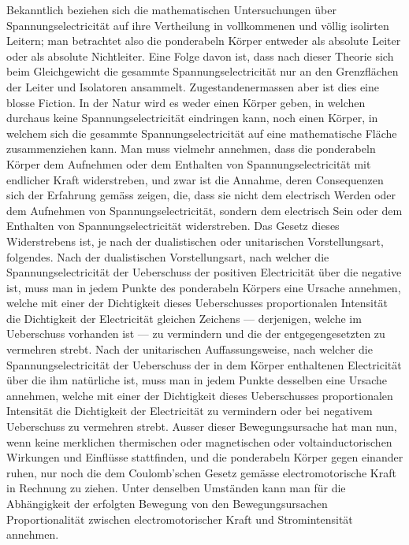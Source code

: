 \documentclass[12pt,a4paper]{article}
\begin{document}
Bekanntlich beziehen sich die mathematischen Untersuchungen über Spannungselectricität auf ihre Vertheilung in vollkommenen und völlig isolirten Leitern; man betrachtet also die ponderabeln Körper entweder als absolute Leiter oder als absolute Nichtleiter. Eine Folge davon ist, dass nach dieser Theorie sich beim Gleichgewicht die gesammte Spannungselectricität nur an den Grenzflächen der Leiter und Isolatoren ansammelt. Zugestandenermassen aber ist dies eine blosse Fiction. In der Natur wird es weder einen Körper geben, in welchen durchaus keine Spannungselectricität eindringen kann, noch einen Körper, in welchem sich die gesammte Spannungselectricität auf eine mathematische Fläche zusammenziehen kann. Man muss vielmehr annehmen, dass die ponderabeln Körper dem Aufnehmen oder dem Enthalten von Spannungselectricität mit endlicher Kraft widerstreben, und zwar ist die Annahme, deren Consequenzen sich der Erfahrung gemäss zeigen, die, dass sie nicht dem electrisch Werden oder dem Aufnehmen von Spannungselectricität, sondern dem electrisch Sein oder dem Enthalten von Spannungselectricität widerstreben. Das Gesetz dieses Widerstrebens ist, je nach der dualistischen oder unitarischen Vorstellungsart, folgendes. Nach der dualistischen Vorstellungsart, nach welcher die Spannungselectricität der Ueberschuss der positiven Electricität über die negative ist, muss man in jedem Punkte des ponderabeln Körpers eine Ursache annehmen, welche mit einer der Dichtigkeit dieses Ueberschusses proportionalen Intensität die Dichtigkeit der Electricität gleichen Zeichens --- derjenigen, welche im Ueberschuss vorhanden ist --- zu vermindern und die der entgegengesetzten zu vermehren strebt. Nach der unitarischen Auffassungsweise, nach welcher die Spannungselectricität der Ueberschuss der in dem Körper enthaltenen Electricität über die ihm natürliche ist, muss man in jedem Punkte desselben eine Ursache annehmen, welche mit einer der Dichtigkeit dieses Ueberschusses proportionalen Intensität die Dichtigkeit der Electricität zu vermindern oder bei negativem Ueberschuss zu vermehren strebt. Ausser dieser Bewegungsursache hat man nun, wenn keine merklichen thermischen oder magnetischen oder voltainductorischen Wirkungen und Einflüsse stattfinden, und die ponderabeln Körper gegen einander ruhen, nur noch die dem Coulomb'schen Gesetz gemässe electromotorische Kraft in Rechnung zu ziehen. Unter denselben Umständen kann man für die Abhängigkeit der erfolgten Bewegung von den Bewegungsursachen Proportionalität zwischen electromotorischer Kraft und Stromintensität annehmen.
\end{document}
